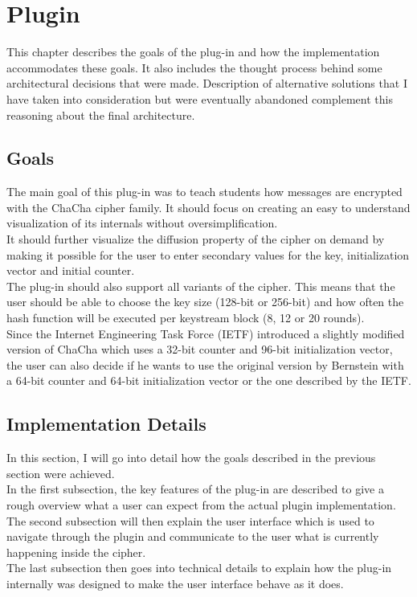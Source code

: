 
\chapter{Plugin}
\label{chap:Plugin}

This chapter describes the goals of the plug-in and how the implementation accommodates these goals. It also includes the thought process behind some architectural decisions that were made. Description of alternative solutions that I have taken into consideration but were eventually abandoned complement this reasoning about the final architecture.

\section{Goals}
\label{sec:goals}

The main goal of this plug-in was to teach students how messages are encrypted with the ChaCha cipher family. It should focus on creating an easy to understand visualization of its internals without oversimplification.\\
It should further visualize the diffusion property of the cipher on demand by making it possible for the user to enter secondary values for the key, initialization vector and initial counter.\\
The plug-in should also support all variants of the cipher. This means that the user should be able to choose the key size (128-bit or 256-bit) and how often the hash function will be executed per keystream block (8, 12 or 20 rounds).\\
Since the Internet Engineering Task Force (IETF) introduced a slightly modified version of ChaCha which uses a 32-bit counter and 96-bit initialization vector, the user can also decide if he wants to use the original version by Bernstein with a 64-bit counter and 64-bit initialization vector or the one described by the IETF.

\section{Implementation Details}
\label{sec:implementationDetails}

In this section, I will go into detail how the goals described in the previous section were achieved. \\
In the first subsection, the key features of the plug-in are described to give a rough overview what a user can expect from the actual plugin implementation. \\
The second subsection will then explain the user interface which is used to navigate through the plugin and communicate to the user what is currently happening inside the cipher. \\
The last subsection then goes into technical details to explain how the plug-in internally was designed to make the user interface behave as it does.

